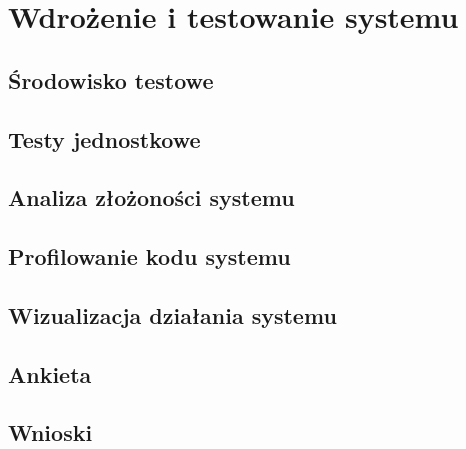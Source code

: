 \newpage\section{Wdrożenie i testowanie systemu \NazwaSys} \label{sec:testy}
\subsection{Środowisko testowe}
\subsection{Testy jednostkowe}
\subsection{Analiza złożoności systemu \NazwaSys}
\subsection{Profilowanie kodu systemu \NazwaSys}
\subsection{Wizualizacja działania systemu \NazwaSys}
\subsection{Ankieta}
\subsection{Wnioski}
 

